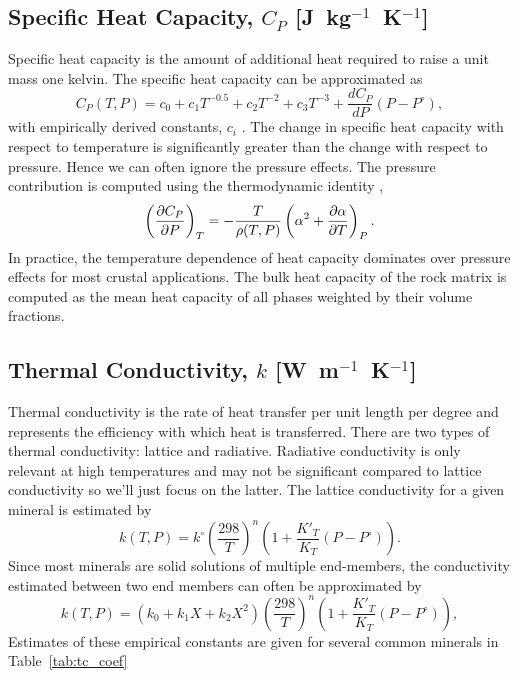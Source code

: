 \subsection{Specific Heat Capacity, $C_P$ [J~kg$^{-1}$~K$^{-1}$]} \label{sec:heat_cap}
Specific heat capacity is the amount of additional heat required to raise a unit
mass one kelvin.  The specific heat capacity can be approximated as
\begin{equation}
    C_{P}(T,P) = c_{0} + c_{1}T^{-0.5} + c_{2}T^{-2} + c_{3}T^{-3}
    + \frac{dC_{P}}{dP}(P - P^\circ),
    \label{eq-cp}
\end{equation}
with empirically derived constants, $c_{i}$ \citep{Fei&Saxena1987}.  The change
in specific heat capacity with respect to temperature is significantly greater
than the change with respect to pressure.  Hence we can often ignore the
pressure effects.  The pressure contribution is computed using the thermodynamic
identity \citep{Osako_etal2004},
\begin{equation}
    \left( \pdv{C_{P}}{P} \right)_{T} =
    - \frac{T}{\rho(T,P)}
    \left( \alpha^2 + \pdv{\alpha}{T} \right)_{P}.
\end{equation}
In practice, the temperature dependence of heat capacity dominates over pressure
effects for most crustal applications.  The bulk heat capacity of the rock matrix
is computed as the mean heat capacity of all phases weighted by their volume
fractions.


\subsection{Thermal Conductivity, $k$ [W~m$^{-1}$~K$^{-1}$]} \label{sec:thermal_cond}
Thermal conductivity is the rate of heat transfer per unit length per degree and
represents the efficiency with which heat is transferred.  There are two types
of thermal conductivity: lattice and radiative.  Radiative conductivity is only
relevant at high temperatures and may not be significant compared to lattice
conductivity so we'll just focus on the latter.  The lattice conductivity for a
given mineral is estimated by
\begin{equation}
    k(T,P) = k^{\circ}
    \left( \frac{298}{T} \right)^n
    \left( 1 + \frac{K'_{T}}{K_{T}}(P - P^\circ) \right).
\end{equation}
Since most minerals are solid solutions of multiple end-members, the
conductivity estimated between two end members can often be approximated by
\begin{equation}
    k(T,P) = \left( k_{0} + k_{1} X + k_{2} X^{2} \right)
    \left( \frac{298}{T} \right)^n
    \left( 1 + \frac{K'_{T}}{K_{T}}(P - P^\circ) \right),
\end{equation}
Estimates of these empirical constants are given for several common minerals in Table~\ref{tab:tc_coef}



